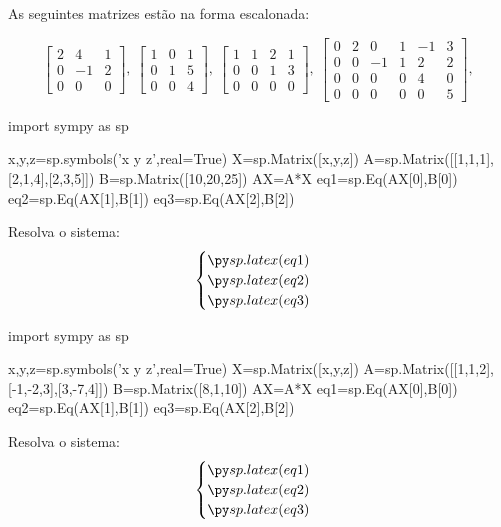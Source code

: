 \begin{frame}[label=sistemas]
As seguintes matrizes estão na forma escalonada:

\[\begin{bmatrix}
2 & 4 & 1\\
0 & -1 & 2 \\
0& 0& 0 
\end{bmatrix},\ 
\begin{bmatrix}
1 & 0 & 1\\
0 & 1 & 5 \\
0& 0& 4 
\end{bmatrix},\ 
\begin{bmatrix}
1 & 1 & 2 & 1\\
0 & 0  & 1 & 3 \\
0& 0& 0 & 0 
\end{bmatrix},\ 
\begin{bmatrix}
0 & 2 & 0 & 1 & -1 & 3\\
0 & 0  & -1 & 1 & 2 & 2 \\
0& 0& 0 & 0 & 4 & 0\\
0 & 0& 0& 0& 0 & 5
\end{bmatrix},\ 
\]

\end{frame}

\begin{frame}[label=sistemas,fragile=singleslide]{ }
\begin{pycode}
import sympy as sp

x,y,z=sp.symbols('x y z',real=True)
X=sp.Matrix([x,y,z])
A=sp.Matrix([[1,1,1],[2,1,4],[2,3,5]])
B=sp.Matrix([10,20,25])
AX=A*X
eq1=sp.Eq(AX[0],B[0])
eq2=sp.Eq(AX[1],B[1])
eq3=sp.Eq(AX[2],B[2])

\end{pycode}

\begin{exe}
Resolva o sistema:
\[\begin{cases}
\pyl{eq1}\\
\pyl{eq2}\\
\pyl{eq3}
\end{cases}\]
\end{exe}

\begin{pycode}
import sympy as sp

x,y,z=sp.symbols('x y z',real=True)
X=sp.Matrix([x,y,z])
A=sp.Matrix([[1,1,2],[-1,-2,3],[3,-7,4]])
B=sp.Matrix([8,1,10])
AX=A*X
eq1=sp.Eq(AX[0],B[0])
eq2=sp.Eq(AX[1],B[1])
eq3=sp.Eq(AX[2],B[2])
\end{pycode}

\begin{exer}
Resolva o sistema:
\[\begin{cases}
\pyl{eq1}\\
\pyl{eq2}\\
\pyl{eq3}
\end{cases}\]
\end{exer}

\end{frame}

